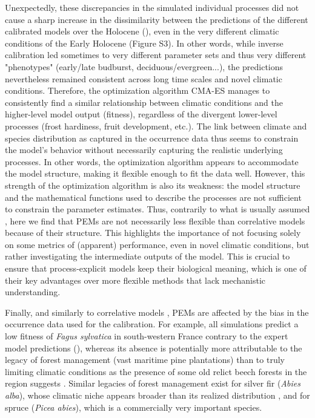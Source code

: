 \documentclass[preprint,12pt,authoryear]{elsarticle}
\begin{document}
{Unexpectedly, these discrepancies in the simulated individual processes did not cause a sharp increase in the dissimilarity between the predictions of the different calibrated models over the Holocene (), even in the very different climatic conditions of the Early Holocene (Figure S3). In other words, while inverse calibration led sometimes to very different parameter sets and thus very different "phenotypes" (early/late budburst, deciduous/evergreen...), the predictions nevertheless remained consistent across long time scales and novel climatic conditions. Therefore, the optimization algorithm \textcolor{customred}{CMA-ES} manages to consistently find  a similar relationship between climatic conditions and the higher-level model output (fitness), regardless of the divergent lower-level processes (frost hardiness, fruit development, etc.). The link between climate and species distribution as captured in the occurrence data thus seems to constrain the model's behavior without necessarily capturing the realistic underlying processes. In other words, the optimization algorithm appears to accommodate the model structure, making it flexible enough to fit the data well. However, this strength of the optimization algorithm is also its weakness: the model structure and the mathematical functions used to describe the processes are not sufficient to constrain the parameter estimates. Thus, contrarily to what is usually assumed \citep{Higgins2020}, here we find that PEMs are not necessarily less flexible than correlative models because of their structure. This highlights the importance of not focusing solely on some metrics of (apparent) performance, even in novel climatic conditions, but rather investigating the intermediate outputs of the model. \textcolor{customred}{This is crucial to ensure that process-explicit models keep their biological meaning, which is one of their key advantages over more flexible methods that lack mechanistic understanding.}

Finally, and similarly to correlative models \citep{BarbetMassin2010, Duputie2014},  PEMs are affected by the bias in the occurrence data used for the calibration. For example, all simulations predict a low fitness of \emph{Fagus sylvatica} in south-western France contrary to the expert model predictions (), whereas its absence is potentially more attributable to the legacy of forest management (vast maritime pine plantations) than to truly limiting climatic conditions as the presence of some old relict beech forests in the region suggests \citep{Lafontaine2014}. \textcolor{customred}{Similar legacies of forest management exist for silver fir (\emph{Abies alba}), whose climatic niche appears broader than its realized distribution \citep{Tinner2013}, and for spruce (\emph{Picea abies}),  which is a commercially very important species.}

}
\end{document}
